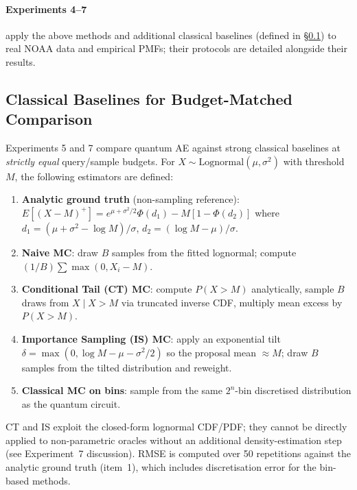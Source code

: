 \documentclass[11pt,a4paper]{article}
\begin{document}
\paragraph{Experiments 4--7} apply the above methods and additional classical baselines (defined in \S\ref{sec:baselines}) to real NOAA data and empirical PMFs; their protocols are detailed alongside their results.

\subsection{Classical Baselines for Budget-Matched Comparison}
\label{sec:baselines}

Experiments 5 and 7 compare quantum AE against strong classical baselines at \emph{strictly equal} query/sample budgets. For $X \sim \mathrm{Lognormal}(\mu, \sigma^2)$ with threshold $M$, the following estimators are defined:

\begin{enumerate}[nosep]
  \item \textbf{Analytic ground truth} (non-sampling reference):
    $E[(X-M)^+] = e^{\mu+\sigma^2/2}\Phi(d_1) - M[1-\Phi(d_2)]$
    where $d_1 = (\mu+\sigma^2-\log M)/\sigma$, $d_2 = (\log M - \mu)/\sigma$.
  \item \textbf{Naive MC}: draw $B$ samples from the fitted lognormal; compute $(1/B)\sum \max(0, X_i - M)$.
  \item \textbf{Conditional Tail (CT) MC}: compute $P(X\!>\!M)$ analytically, sample $B$ draws from $X \mid X\!>\!M$ via truncated inverse CDF, multiply mean excess by $P(X\!>\!M)$.
  \item \textbf{Importance Sampling (IS) MC}: apply an exponential tilt $\delta = \max(0, \log M - \mu - \sigma^2/2)$ so the proposal mean $\approx M$; draw $B$ samples from the tilted distribution and reweight.
  \item \textbf{Classical MC on bins}: sample from the same $2^n$-bin discretised distribution as the quantum circuit.
\end{enumerate}

\noindent CT and IS exploit the closed-form lognormal CDF/PDF; they cannot be directly applied to non-parametric oracles without an additional density-estimation step (see Experiment~7 discussion). RMSE is computed over 50 repetitions against the analytic ground truth (item~1), which includes discretisation error for the bin-based methods.


\end{document}
